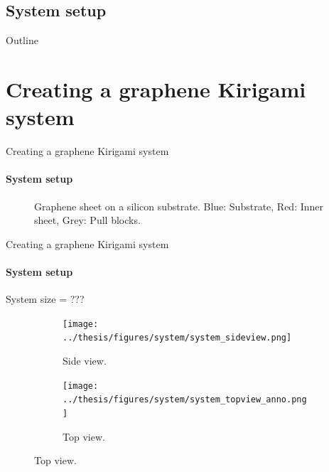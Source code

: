 \documentclass[
	10pt, %
]{beamer}
\begin{document}
\subsection{System setup}
\begin{frame}{Outline}
    \tableofcontents[currentsection]
\end{frame}

\section{Creating a graphene Kirigami system} %
\begin{frame}{Creating a graphene Kirigami system}
\framesubtitle{System setup}
	\begin{figure}
		\centering    
		\caption{Graphene sheet on a silicon substrate. Blue: Substrate, Red: Inner sheet, Grey: Pull blocks. }
	\end{figure} 
\end{frame}
%
%
\begin{frame}{Creating a graphene Kirigami system}
\framesubtitle{System setup}
	System size = ???

	\begin{figure}[H]
		\centering
		\begin{subfigure}[b]{0.5\textwidth}
			\centering
			\texttt{[image: ../thesis/figures/system/system\_sideview.png]}
			\caption{Side view.}
		\end{subfigure}
		\begin{subfigure}[b]{0.5\textwidth}
			\centering
			\texttt{[image: ../thesis/figures/system/system\_topview\_anno.png]}
			\caption{Top view.}
		\end{subfigure}
	\end{figure}
\end{frame}
%
%
\end{document}
